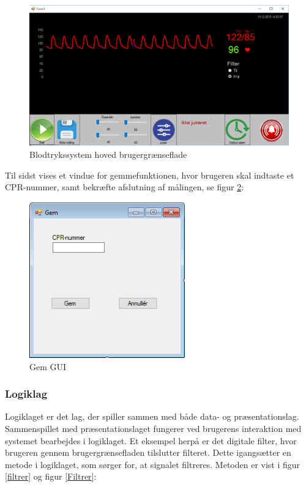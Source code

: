 \begin{figure}[H]
	\centering
	\includegraphics[width=1\textwidth]{Figurer/SoftwareImplementering/blodtryk}
	\caption{Blodtrykssystem hoved brugergrænseflade}
	\label{form1}
\end{figure}

Til sidst vises et vindue for gemmefunktionen, hvor brugeren skal indtaste et CPR-nummer, samt bekræfte afslutning af målingen, se figur \ref{Gem}:

\begin{figure}[H]
	\centering
	\includegraphics[width=0.6\textwidth]{Figurer/SoftwareImplementering/Gem}
	\caption{Gem GUI}
	\label{Gem}
\end{figure}

\subsubsection{Logiklag}\label{Logiklag}
Logiklaget er det lag, der spiller sammen med både data- og præsentationslag. Sammenspillet med præsentationslaget fungerer ved brugerens interaktion med systemet bearbejdes i logiklaget. Et eksempel herpå er det digitale filter, hvor brugeren gennem brugergrænsefladen tilslutter filteret. Dette igangsætter en metode i logiklaget, som sørger for, at signalet filtreres. Metoden er vist i figur \ref{filtrer} og figur \ref{Filtrer}:

